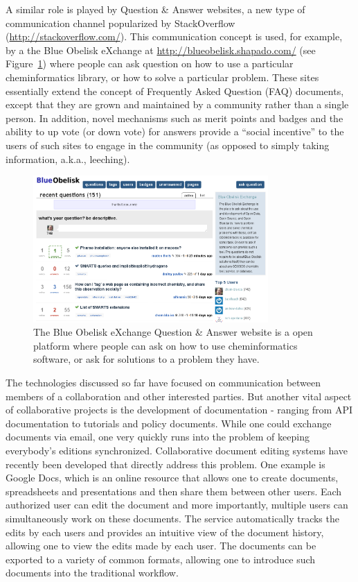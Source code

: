 \documentclass[11pt]{book}
\begin{document}
A similar role is played by Question \& Answer websites, a new
type of communication channel popularized by StackOverflow
(\url{http://stackoverflow.com/}). This communication
concept is used, for example, by a the Blue Obelisk
eXchange at \url{http://blueobelisk.shapado.com/}
(see Figure~\ref{fig:shapado}) where
people can ask question on how to use a particular
cheminformatics library, or how to solve a particular
problem. These sites essentially extend the concept of Frequently
Asked Question (FAQ) documents, except that they are grown and
maintained by a community rather than a single person. In addition,
novel mechanisms such as merit points and badges and the ability to
up vote (or down vote) for answers provide a ``social incentive'' to
the users of such sites to engage in the community (as opposed to
simply taking information, a.k.a., leeching).

\begin{figure}[bt]
\begin{center}
\includegraphics[width=0.8\textwidth]{graphics/boShapado.png}
\end{center}
\caption{The Blue Obelisk eXchange Question \& Answer
website is a open platform where people can ask on how
to use cheminformatics software, or ask for solutions
to a problem they have.}
\label{fig:shapado}
\end{figure}

The technologies discussed so far have focused on communication
between members of a collaboration and other interested parties. But
another vital aspect of collaborative projects is the development of
documentation - ranging from API documentation to tutorials and policy
documents. While one could exchange documents via email, one very
quickly runs into the problem of keeping everybody's editions
synchronized. Collaborative document editing systems have recently
been developed that directly address this problem. One example is
Google Docs, which is an online resource that allows one to create
documents, spreadsheets and presentations and then share them between
other users. Each authorized user can edit the document and more
importantly, multiple users can simultaneously work on these
documents. The service automatically tracks the edits by each users and
provides an intuitive view of the document history, allowing one to
view the edits made by each user. The documents can be exported to a
variety of common formats, allowing one to introduce such documents
into the traditional workflow.
\end{document}
